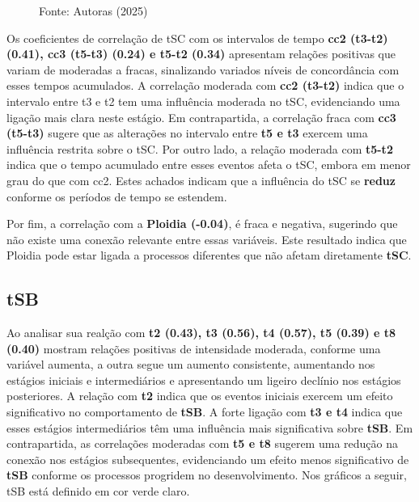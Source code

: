 \begin{figure}[h]
\begin{minipage}[b]{0.45\linewidth}
        \vspace{0.3cm}
        \begin{minipage}{\linewidth}
            \centering
            \scriptsize{Fonte: Autoras (2025)}
        \end{minipage}
    \end{minipage}
\end{figure}
\FloatBarrier

Os coeficientes de correlação de tSC com os intervalos de tempo \textbf{cc2 (t3-t2) (0.41), cc3 (t5-t3) (0.24) e t5-t2 (0.34)} apresentam relações positivas que variam de moderadas a fracas, sinalizando variados níveis de concordância com esses tempos acumulados. A correlação moderada com \textbf{cc2 (t3-t2)} indica que o intervalo entre t3 e t2 tem uma influência moderada no tSC, evidenciando uma ligação mais clara neste estágio. Em contrapartida, a correlação fraca com \textbf{cc3 (t5-t3)} sugere que as alterações no intervalo entre \textbf{t5 e t3} exercem uma influência restrita sobre o tSC. Por outro lado, a relação moderada com \textbf{t5-t2} indica que o tempo acumulado entre esses eventos afeta o tSC, embora em menor grau do que com cc2. Estes achados indicam que a influência do tSC se \textbf{reduz} conforme os períodos de tempo se estendem.

Por fim, a correlação com a \textbf{Ploidia (-0.04)}, é fraca e negativa, sugerindo que não existe uma conexão relevante entre essas variáveis. Este resultado indica que Ploidia pode estar ligada a processos diferentes que não afetam diretamente \textbf{tSC}.

\subsection*{tSB}
Ao analisar sua realção com \textbf{t2 (0.43), t3 (0.56), t4 (0.57), t5 (0.39) e t8 (0.40)} mostram relações positivas de intensidade moderada, conforme uma variável aumenta, a outra segue um aumento consistente, aumentando nos estágios iniciais e intermediários e apresentando um ligeiro declínio nos estágios posteriores. A relação com \textbf{t2} indica que os eventos iniciais exercem um efeito significativo no comportamento de \textbf{tSB}. A forte ligação com \textbf{t3 e t4} indica que esses estágios intermediários têm uma influência mais significativa sobre \textbf{tSB}. Em contrapartida, as correlações moderadas com \textbf{t5 e t8} sugerem uma redução na conexão nos estágios subsequentes, evidenciando um efeito menos significativo de \textbf{tSB} conforme os processos progridem no desenvolvimento. Nos gráficos a seguir, tSB está definido em cor verde claro.

